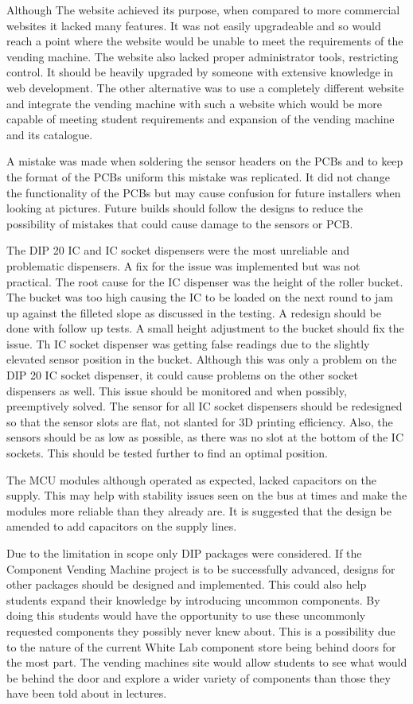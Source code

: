 \documentclass[a4paper,11pt]{article}
\numberwithin{figure}{section}
\numberwithin{table}{section}
\begin{document}
Although The website achieved its purpose, when compared to more commercial websites it lacked many features. It was not easily upgradeable and so would reach a point where the website would be unable to meet the requirements of the vending machine. The website also lacked proper administrator tools, restricting control. It should be heavily upgraded by someone with extensive knowledge in web development. The other alternative was to use a completely different website and integrate the vending machine with such a website which would be more capable of meeting student requirements and expansion of the vending machine and its catalogue.

A mistake was made when soldering the sensor headers on the PCBs and to keep the format of the PCBs uniform this mistake was replicated. It did not change the functionality of the PCBs but may cause confusion for future installers when looking at pictures. Future builds should follow the designs to reduce the possibility of mistakes that could cause damage to the sensors or PCB.

The DIP 20 IC and IC socket dispensers were the most unreliable and problematic dispensers. A fix for the issue was implemented but was not practical. The root cause for the IC dispenser was the height of the roller bucket. The bucket was too high causing the IC to be loaded on the next round to jam up against the filleted slope as discussed in the testing. A redesign should be done with follow up tests. A small height adjustment to the bucket should fix the issue. Th IC socket dispenser was getting false readings due to the slightly elevated sensor position in the bucket. Although this was only a problem on the DIP 20 IC socket dispenser, it could cause problems on the other socket dispensers as well. This issue should be monitored and when possibly, preemptively solved. The sensor for all IC socket dispensers should be redesigned so that the sensor slots are flat, not slanted for 3D printing efficiency. Also, the sensors should be as low as possible, as there was no slot at the bottom of the IC sockets. This should be tested further to find an optimal position.

The MCU modules although operated as expected, lacked capacitors on the supply. This may help with stability issues seen on the bus at times and make the modules more reliable than they already are. It is suggested that the design be amended to add capacitors on the supply lines.

Due to the limitation in scope only DIP packages were considered. If the Component Vending Machine project is to be successfully advanced, designs for other packages should be designed and implemented. This could also help students expand their knowledge by introducing uncommon components. By doing this students would have the opportunity to use these uncommonly requested components they possibly never knew about. This is a possibility due to the nature of the current White Lab component store being behind doors for the most part. The vending machines site would allow students to see what would be behind the door and explore a wider variety of components than those they have been told about in lectures.
\end{document}
